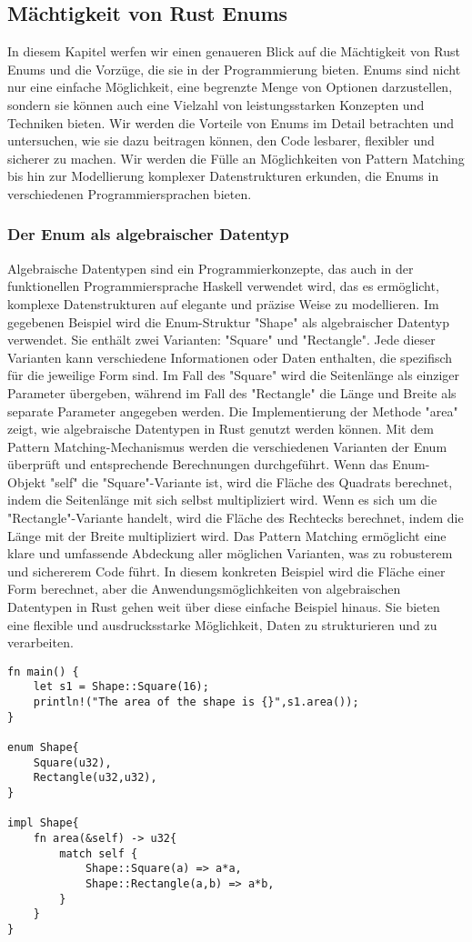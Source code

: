 \documentclass[a4paper, 1ppt]{article}
\begin{document}
\subsection{Mächtigkeit von Rust Enums}
In diesem Kapitel werfen wir einen genaueren Blick auf die Mächtigkeit von Rust Enums und die Vorzüge, die sie in der Programmierung bieten. Enums sind nicht nur eine einfache Möglichkeit, eine begrenzte Menge von Optionen darzustellen, sondern sie können auch eine Vielzahl von leistungsstarken Konzepten und Techniken bieten. Wir werden die Vorteile von Enums im Detail betrachten und untersuchen, wie sie dazu beitragen können, den Code lesbarer, flexibler und sicherer zu machen. Wir werden die Fülle an Möglichkeiten von Pattern Matching bis hin zur Modellierung komplexer Datenstrukturen erkunden, die Enums in verschiedenen Programmiersprachen bieten. 
\subsubsection{Der Enum als algebraischer Datentyp}
Algebraische Datentypen sind ein Programmierkonzepte, das auch in der funktionellen Programmiersprache Haskell verwendet wird, das es ermöglicht, komplexe Datenstrukturen auf elegante und präzise Weise zu modellieren. 
Im gegebenen Beispiel wird die Enum-Struktur "Shape" als algebraischer Datentyp verwendet. Sie enthält zwei Varianten: "Square" und "Rectangle". Jede dieser Varianten kann verschiedene Informationen oder Daten enthalten, die spezifisch für die jeweilige Form sind. Im Fall des "Square" wird die Seitenlänge als einziger Parameter übergeben, während im Fall des "Rectangle" die Länge und Breite als separate Parameter angegeben werden.
Die Implementierung der Methode "area" zeigt, wie algebraische Datentypen in Rust genutzt werden können. Mit dem Pattern Matching-Mechanismus werden die verschiedenen Varianten der Enum überprüft und entsprechende Berechnungen durchgeführt. Wenn das Enum-Objekt "self" die "Square"-Variante ist, wird die Fläche des Quadrats berechnet, indem die Seitenlänge mit sich selbst multipliziert wird. Wenn es sich um die "Rectangle"-Variante handelt, wird die Fläche des Rechtecks berechnet, indem die Länge mit der Breite multipliziert wird.
Das Pattern Matching ermöglicht eine klare und umfassende Abdeckung aller möglichen Varianten, was zu robusterem und sichererem Code führt. In diesem konkreten Beispiel wird die Fläche einer Form berechnet, aber die Anwendungsmöglichkeiten von algebraischen Datentypen in Rust gehen weit über diese einfache Beispiel hinaus. Sie bieten eine flexible und ausdrucksstarke Möglichkeit, Daten zu strukturieren und zu verarbeiten.
\begin{verbatim}
fn main() {
    let s1 = Shape::Square(16);
    println!("The area of the shape is {}",s1.area());
}

enum Shape{
    Square(u32),
    Rectangle(u32,u32),
}

impl Shape{
    fn area(&self) -> u32{
        match self {
            Shape::Square(a) => a*a,
            Shape::Rectangle(a,b) => a*b,
        }
    }
}
\end{verbatim}
\end{document}
